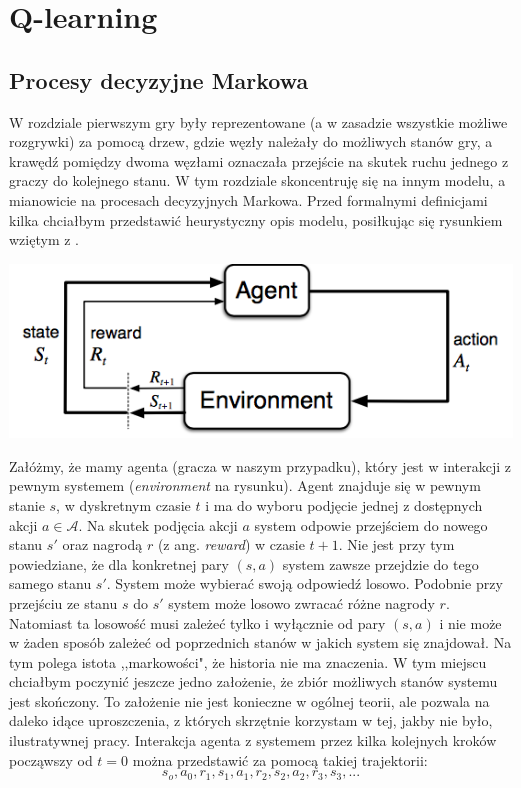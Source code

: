 \documentclass[licencjacka]{pracamgr}
\begin{document}
\chapter{Q-learning}\label{r:Tablica}

\section{Procesy decyzyjne Markowa}
W rozdziale pierwszym gry były reprezentowane (a w zasadzie wszystkie możliwe rozgrywki) za pomocą drzew, gdzie węzły należały do możliwych stanów gry, a krawędź pomiędzy dwoma węzłami oznaczała przejście na skutek ruchu jednego z graczy do kolejnego stanu. W tym rozdziale skoncentruję się na innym modelu, a mianowicie na procesach decyzyjnych Markowa.  Przed formalnymi definicjami kilka chciałbym przedstawić heurystyczny opis modelu, posiłkując się rysunkiem wziętym z \cite{RL}.\\

\begin{flushleft}
	\includegraphics [scale=0.6] {agent_env.png}
\end{flushleft}

Załóżmy, że mamy agenta (gracza w naszym przypadku), który jest w interakcji z pewnym systemem (\textit{environment} na rysunku). Agent znajduje się w pewnym stanie $s$, w dyskretnym czasie $t$ i ma do wyboru podjęcie jednej z dostępnych akcji $a\in\mathcal{A}$. Na skutek podjęcia akcji $a$ system odpowie przejściem do nowego stanu $s'$ oraz nagrodą $r$ (z ang. \textit{reward}) w czasie $t+1$.  Nie jest przy tym powiedziane, że dla konkretnej pary $(s,a)$ system zawsze przejdzie do tego samego stanu $s'$. System może wybierać swoją odpowiedź losowo. Podobnie przy przejściu ze stanu $s$ do $s'$ system może losowo zwracać różne nagrody $r$.  Natomiast ta losowość musi zależeć tylko i wyłącznie od pary $(s,a)$ i nie może w żaden sposób zależeć od poprzednich stanów w jakich system się znajdował. Na tym polega istota ,,markowości", że historia nie ma znaczenia. W tym miejscu chciałbym poczynić jeszcze jedno założenie, że zbiór możliwych stanów systemu jest skończony. To założenie nie jest konieczne w ogólnej teorii, ale pozwala na daleko idące uproszczenia, z których skrzętnie korzystam w tej, jakby nie było, ilustratywnej pracy. Interakcja agenta z systemem przez kilka kolejnych kroków począwszy od $t=0$ można przedstawić za pomocą takiej trajektorii:
$$s_{o}, a_{0}, r_{1}, s_{1}, a_{1}, r_{2}, s_{2}, a_{2}, r_{3}, s_{3},...$$
\end{document}
